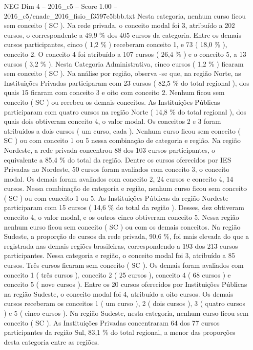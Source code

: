 \begin{textsample}{NEG Dim 4 – 2016\_c5 – Score 1.00 – 2016\_c5/enade\_2016\_fisio\_f3597e5bbb.txt}
Nesta categoria, nenhum curso ficou sem conceito ( SC ).
Na rede privada, o conceito modal foi 3, atribuído a 202 cursos, o correspondente a 49,9 \% dos 405 cursos da categoria.
Entre os demais cursos participantes, cinco ( 1,2 \% ) receberam conceito 1, e 73 ( 18,0 \% ), conceito 2.
O conceito 4 foi atribuído a 107 cursos ( 26,4 \% ) e o conceito 5, a 13 cursos ( 3,2 \% ).
Nesta Categoria Administrativa, cinco cursos ( 1,2 \% ) ficaram sem conceito ( SC ).
Na análise por região, observa -se que, na região Norte, as Instituições Privadas participaram com 23 cursos ( 82,5 \% do total regional ), dos quais 15 ficaram com conceito 3 e oito com conceito 2.
Nenhum ficou sem conceito ( SC ) ou recebeu os demais conceitos.
As Instituições Públicas participaram com quatro cursos na região Norte ( 14,8 \% do total regional ), dos quais dois obtiveram conceito 4, o valor modal.
Os conceitos 2 e 3 foram atribuídos a dois cursos ( um curso, cada ).
Nenhum curso ficou sem conceito ( SC ) ou com conceito 1 ou 5 nessa combinação de categoria e região.
Na região Nordeste, a rede privada concentrou 88 dos 103 cursos participantes, o equivalente a 85,4 \% do total da região.
Dentre os cursos oferecidos por IES Privadas no Nordeste, 50 cursos foram avaliados com conceito 3, o conceito modal.
Os demais foram avaliados com conceito 2, 24 cursos e conceito 4, 14 cursos.
Nessa combinação de categoria e região, nenhum curso ficou sem conceito ( SC ) ou com conceito 1 ou 5.
As Instituições Públicas da região Nordeste participaram com 15 cursos ( 14,6 \% do total da região ).
Desses, dez obtiveram conceito 4, o valor modal, e os outros cinco obtiveram conceito 5.
Nessa região nenhum curso ficou sem conceito ( SC ) ou com os demais conceitos.
Na região Sudeste, a proporção de cursos da rede privada, 90,6 \%, foi mais elevada do que a registrada nas demais regiões brasileiras, correspondendo a 193 dos 213 cursos participantes.
Nessa categoria e região, o conceito modal foi 3, atribuído a 85 cursos.
Três cursos ficaram sem conceito ( SC ).
Os demais foram avaliados com conceito 1 ( três cursos ), conceito 2 ( 25 cursos ), conceito 4 ( 68 cursos ) e conceito 5 ( nove cursos ).
Entre os 20 cursos oferecidos por Instituições Públicas na região Sudeste, o conceito modal foi 4, atribuído a oito cursos.
Os demais cursos receberam os conceitos 1 ( um curso ), 2 ( dois cursos ), 3 ( quatro cursos ) e 5 ( cinco cursos ).
Na região Sudeste, nesta categoria, nenhum curso ficou sem conceito ( SC ).
As Instituições Privadas concentraram 64 dos 77 cursos participantes da região Sul, 83,1 \% do total regional, a menor das proporções desta categoria entre as regiões.

\end{textsample}
